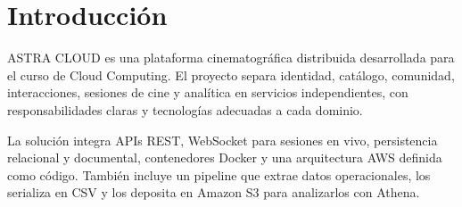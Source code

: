 \chapter{Introducción}
ASTRA CLOUD es una plataforma cinematográfica distribuida desarrollada para el curso de Cloud Computing. El proyecto separa identidad, catálogo, comunidad, interacciones, sesiones de cine y analítica en servicios independientes, con responsabilidades claras y tecnologías adecuadas a cada dominio.

La solución integra APIs REST, WebSocket para sesiones en vivo, persistencia relacional y documental, contenedores Docker y una arquitectura AWS definida como código. También incluye un pipeline que extrae datos operacionales, los serializa en CSV y los deposita en Amazon S3 para analizarlos con Athena.

